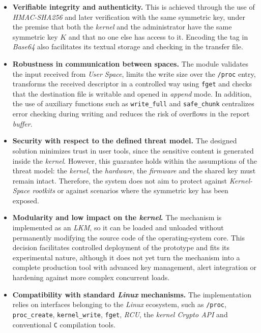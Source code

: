 \begin{itemize}
    \item \textbf{Verifiable integrity and authenticity.} This is achieved through the use of \textit{HMAC-SHA256} and later verification with the same symmetric key, under the premise that both the \textit{kernel} and the administrator have the same symmetric key \(K\) and that no one else has access to it. Encoding the tag in \textit{Base64} also facilitates its textual storage and checking in the transfer file.
    
    \item \textbf{Robustness in communication between spaces.} The module validates the input received from \textit{User Space}, limits the write size over the \texttt{/proc} entry, transforms the received descriptor in a controlled way using \verb|fget| and checks that the destination file is writable and opened in \textit{append} mode. In addition, the use of auxiliary functions such as \verb|write_full| and \verb|safe_chunk| centralizes error checking during writing and reduces the risk of overflows in the report \textit{buffer}.
    
    \item \textbf{Security with respect to the defined threat model.} The designed solution minimizes trust in user tools, since the sensitive content is generated inside the \textit{kernel}. However, this guarantee holds within the assumptions of the threat model: the \textit{kernel}, the \textit{hardware}, the \textit{firmware} and the shared key must remain intact. Therefore, the system does not aim to protect against \textit{Kernel-Space rootkits} or against scenarios where the symmetric key has been exposed.
    
    \item \textbf{Modularity and low impact on the \textit{kernel}.} The mechanism is implemented as an \textit{LKM}, so it can be loaded and unloaded without permanently modifying the source code of the operating-system core. This decision facilitates controlled deployment of the prototype and fits its experimental nature, although it does not yet turn the mechanism into a complete production tool with advanced key management, alert integration or hardening against more complex concurrent loads.
    
    \item \textbf{Compatibility with standard \textit{Linux} mechanisms.} The implementation relies on interfaces belonging to the \textit{Linux} ecosystem, such as \texttt{/proc}, \verb|proc_create|, \verb|kernel_write|, \verb|fget|, \textit{RCU}, the \textit{kernel Crypto API} and conventional \texttt{C} compilation tools.
    

\end{itemize}
